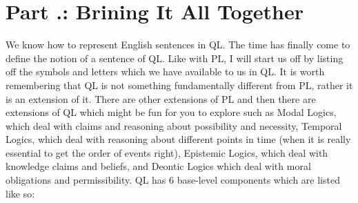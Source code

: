 



\section{Part \thechapcount.\theseccount: Brining It All Together}
We know how to represent English sentences in QL. The time has finally come to define the notion of a \gls{sentence of QL}. Like with PL, I will start us off by listing off the symbols and letters which we have available to us in QL. It is worth remembering that QL is not something fundamentally different from PL, rather it is an extension of it. There are other extensions of PL and then there are extensions of QL which might be fun for you to explore such as Modal Logics, which deal with claims and reasoning about possibility and necessity, Temporal Logics, which deal with reasoning about different points in time (when it is really essential to get the order of events right), Epistemic Logics, which deal with knowledge claims and beliefs, and Deontic Logics which deal with moral obligations and permissibility. QL has 6 base-level components which are listed like so: 

